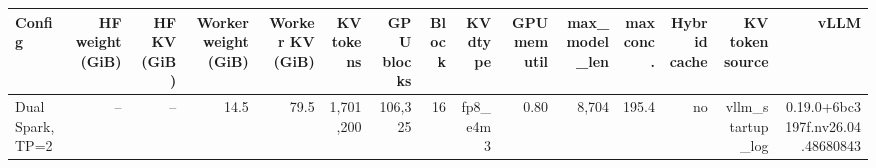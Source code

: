 \begin{tabular}{l r r r r r r r r r r r r r r }
\toprule
Config & HF weight (GiB) & HF KV (GiB) & Worker weight (GiB) & Worker KV (GiB) & KV tokens & GPU blocks & Block & KV dtype & GPU mem util & max\_model\_len & max conc. & Hybrid cache & KV token source & vLLM \\
\midrule
Dual Spark, TP=2 & -- & -- & 14.5 & 79.5 & 1,701,200 & 106,325 & 16 & fp8\_e4m3 & 0.80 & 8,704 & 195.4 & no & vllm\_startup\_log & 0.19.0+6bc3197f.nv26.04.48680843 \\
\bottomrule
\end{tabular}
